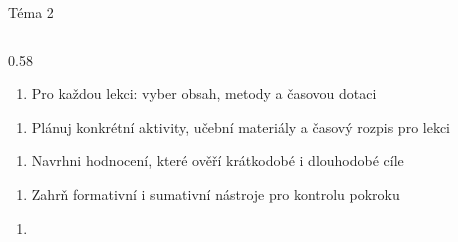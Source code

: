 \documentclass[aspectratio=169]{beamer}
\begin{document}
\begin{frame}{Téma 2}
\begin{columns}[T,onlytextwidth]
\begin{column}{0.58\textwidth}
\begin{enumerate}

\def\labelenumi{\arabic{enumi}.}

\setcounter{enumi}{4}

\tightlist

\item

  Pro každou lekci: vyber obsah, metody a časovou dotaci

\end{enumerate}


\begin{enumerate}

\def\labelenumi{\arabic{enumi}.}

\setcounter{enumi}{5}

\tightlist

\item

  Plánuj konkrétní aktivity, učební materiály a časový rozpis pro lekci

\end{enumerate}


\begin{enumerate}

\def\labelenumi{\arabic{enumi}.}

\setcounter{enumi}{6}

\tightlist

\item

  Navrhni hodnocení, které ověří krátkodobé i dlouhodobé cíle

\end{enumerate}


\begin{enumerate}

\def\labelenumi{\arabic{enumi}.}

\setcounter{enumi}{7}

\tightlist

\item

  Zahrň formativní i sumativní nástroje pro kontrolu pokroku

\end{enumerate}


\begin{enumerate}

\def\labelenumi{\arabic{enumi}.}

\setcounter{enumi}{8}

\tightlist

\item


\end{enumerate}
\end{column}
\end{columns}
\end{frame}
\end{document}
